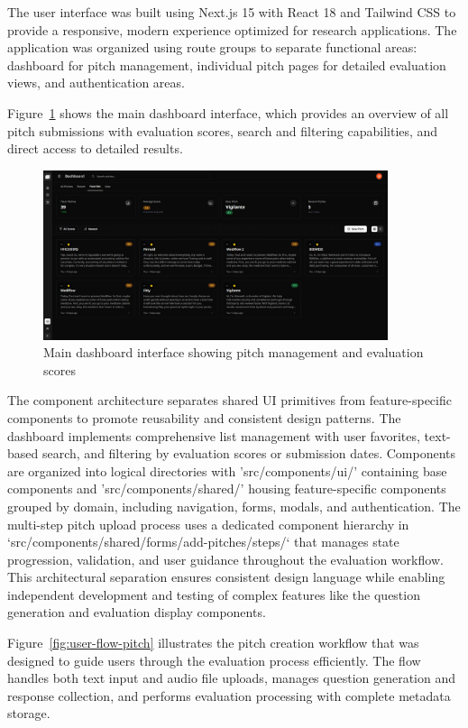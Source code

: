 The user interface was built using Next.js 15 with React 18 and Tailwind CSS to provide a responsive, modern experience optimized for research applications. The application was organized using route groups to separate functional areas: dashboard for pitch management, individual pitch pages for detailed evaluation views, and authentication areas.

Figure~\ref{fig:dashboard} shows the main dashboard interface, which provides an overview of all pitch submissions with evaluation scores, search and filtering capabilities, and direct access to detailed results.

\begin{figure}[H]
  \centering
  \includegraphics[width=0.9\textwidth]{img/dashboard}
\caption{Main dashboard interface showing pitch management and evaluation scores}
  \label{fig:dashboard}
\end{figure}

The component architecture separates shared UI primitives from feature-specific components to promote reusability and consistent design patterns. The dashboard implements comprehensive list management with user favorites, text-based search, and filtering by evaluation scores or submission dates. Components are organized into logical directories with 'src/components/ui/' containing base components and 'src/components/shared/' housing feature-specific components grouped by domain, including navigation, forms, modals, and authentication. The multi-step pitch upload process uses a dedicated component hierarchy in `src/components/shared/forms/add-pitches/steps/` that manages state progression, validation, and user guidance throughout the evaluation workflow. This architectural separation ensures consistent design language while enabling independent development and testing of complex features like the question generation and evaluation display components.

Figure~\ref{fig:user-flow-pitch} illustrates the pitch creation workflow that was designed to guide users through the evaluation process efficiently. The flow handles both text input and audio file uploads, manages question generation and response collection, and performs evaluation processing with complete metadata storage.

